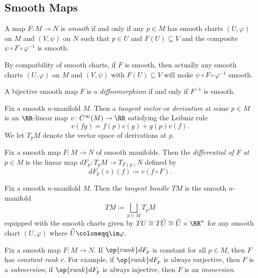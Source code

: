 \documentclass{article}
\begin{document}
\subsection{Smooth Maps}
\begin{definition}[smooth]
	A map $F\colon M\to N$ is \textit{smooth} if and only if any $p\in M$ has smooth charts $(U,\varphi)$ on $M$ and $(V,\psi)$ on $N$ such that $p\in U$ and $F(U)\subseteq V$ and the composite $\psi\circ F\circ\varphi^{-1}$ is smooth.
\end{definition}
\begin{remark}
	By compatbility of smooth charts, if $F$ is smooth, then actually any smooth charts $(U,\varphi)$ on $M$ and $(V,\psi)$ with $F(U)\subseteq V$ will make $\psi\circ F\circ\varphi^{-1}$ smooth.
\end{remark}
\begin{definition}[diffeomorphism]
	A bijective smooth map $F$ is a \textit{diffeomorphism} if and only if $F^{-1}$ is smooth.
\end{definition}
\begin{definition}
	Fix a smooth $n$-manifold $M$. Then a \textit{tangent vector} or \textit{derivation} at some $p\in M$ is an $\RR$-linear map $v\colon C^\infty(M)\to\RR$ satisfying the Leibniz rule
	\[v(fg)=f(p)v(g)+g(p)v(f).\]
	We let $T_pM$ denote the vector space of derivations at $p$.
\end{definition}
\begin{definition}[differential]
	Fix a smooth map $F\colon M\to N$ of smooth manifolds. Then the \textit{differential of $F$ at $p\in M$} is the linear map $dF_p\colon T_pM\to T_{F(p)}N$ defined by
	\[dF_p(v)(f)\coloneqq v(f\circ F).\]
\end{definition}
\begin{definition}
	Fix a smooth $n$-manifold $M$. Then the \textit{tangent bundle $TM$} is the smooth $n$-manifold
	\[TM\coloneqq\bigsqcup_{p\in M}T_pM\]
	equipped with the smooth charts given by $TU\cong T\widehat U\cong\widehat U\times\RR^n$ for any smooth chart $(U,\varphi)$ where $\widehat U\coloneqq\im\varphi$.
\end{definition}
\begin{definition}
	Fix a smooth map $F\colon M\to N$. If $\op{rank}dF_p$ is constant for all $p\in M$, then $F$ has \textit{constant rank $r$}. For example, if $\op{rank}dF_p$ is always surjective, then $F$ is a \textit{submersion}; if $\op{rank}dF_p$ is always injective, then $F$ is an \textit{immersion}.
\end{definition}
\end{document}
